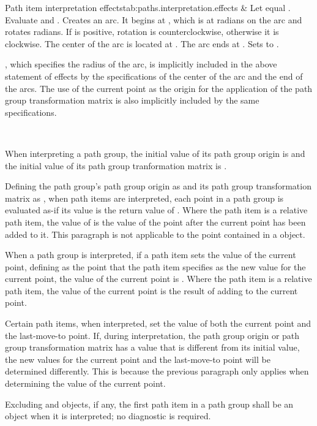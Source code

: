 \begin{libreqtab2a}{Path item interpretation effects}{tab:paths.interpretation.effects}
 &
Let  equal . Evaluate  and . Creates an arc. It begins at , which is at  radians on the arc and rotates  radians. If  is positive, rotation is counterclockwise, otherwise it is clockwise. The center of the arc is located at . The arc ends at . Sets  to .

\begin{note} , which specifies the radius of the arc, is implicitly included in the above statement of effects by the specifications of the center of the arc and the end of the arcs. The use of the current point as the origin for the application of the path group transformation matrix is also implicitly included by the same specifications. \end{note} \\
\end{libreqtab2a}

\pnum
When interpreting a path group, the initial value of its path group origin is  and the initial value of its path group tranformation matrix is .

\pnum
Defining the path group's path group origin as  and its path group transformation matrix as , when path items are interpreted, each point  in a path group is evaluated as-if its value is the return value of . Where the path item is a relative path item, the value of  is the value of the point after the current point has been added to it. This paragraph is not applicable to the point contained in a  object.

\pnum
When a path group is interpreted, if a path item sets the value of the current point, defining  as the point that the path item specifies as the new value for the current point, the value of the current point is . Where the path item is a relative path item, the value of the current point is the result of adding  to the current point.

\pnum
\begin{note}
Certain path items, when interpreted, set the value of both the current point and the last-move-to point. If, during interpretation, the path group origin or path group transformation matrix has a value that is different from its initial value, the new values for the current point and the last-move-to point will be determined differently. This is because the previous paragraph only applies when determining the value of the current point.
\end{note}

\pnum
Excluding  and  objects, if any, the first path item in a path group shall be an  object when it is interpreted; no diagnostic is required.
